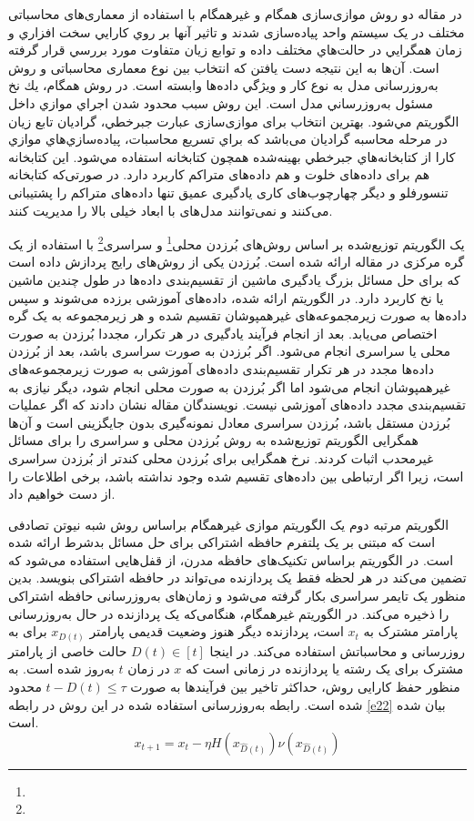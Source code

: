 در مقاله \cite{Ma2019} دو روش موازی‌سازی  همگام و  غیرهمگام با استفاده از معماری‌های‌ محاسباتی مختلف در یک سیستم واحد پیاده‌سازی شدند و تاثير آنها بر روي كارايي سخت افزاري و زمان همگرايي در حالت‌هاي مختلف داده و توابع زیان متفاوت مورد بررسي قرار گرفته است. آن‌ها به این نتیجه دست یافتن که انتخاب بين نوع معماری محاسباتی و روش به‌روزرسانی مدل  به نوع کار و ويژگي داده‌ها وابسته است. در روش  همگام، يك نخ مسئول به‌روزرساني مدل است. اين روش سبب محدود شدن اجراي موازي داخل الگوریتم مي‌شود. بهترین انتخاب برای موازی‌سازی عبارت جبرخطي، گراديان تابع زیان در مرحله محاسبه گراديان می‌باشد که براي تسريع محاسبات، پياده‌سازي‌هاي موازي كارا از كتابخانه‌هاي جبرخطي بهينه‌شده همچون کتابخانه  استفاده مي‌شود. این کتابخانه هم برای داده‌های خلوت و هم داده‌های متراکم کاربرد دارد. در صورتی‌که کتابخانه تنسورفلو و دیگر چهارچوب‌های کاری یادگیری عمیق تنها داده‌های متراکم را پشتیبانی می‌کنند و نمی‌توانند مدل‌های با ابعاد خیلی بالا را مدیریت کنند. 

یک الگوریتم  توزیع‌شده بر اساس روش‌های بُرزدن محلی\footnote{}  و سراسری\footnote{}  با استفاده از یک گره مرکزی در مقاله \cite{MENG201946} ارائه شده است. بُرزدن یکی از روش‌های رایج پردازش داده است که برای حل مسائل بزرگ یادگیری ماشین از تقسیم‌بندی داده‌ها در طول چندین ماشین یا نخ کاربرد دارد. در الگوریتم ارائه شده، داده‌های آموزشی برزده می‌شوند و سپس داده‌ها به صورت زیرمجموعه‌های غیرهمپوشان تقسیم شده و هر زیرمجموعه به یک گره اختصاص می‌یابد. بعد از انجام فرآیند یادگیری در هر تکرار، مجددا بُرزدن به صورت محلی یا سراسری انجام می‌شود. اگر بُرزدن به صورت سراسری باشد، بعد از بُرزدن داده‌ها مجدد در هر تکرار تقسیم‌بندی داده‌های آموزشی به صورت زیرمجموعه‌های غیرهمپوشان انجام می‌شود اما اگر بُرزدن به صورت محلی انجام شود، دیگر نیازی به تقسیم‌بندی مجدد داده‌های آموزشی نیست. نویسندگان مقاله نشان دادند که اگر عملیات بُرزدن مستقل باشد، بُرزدن سراسری معادل نمونه‌گیری بدون جایگزینی است و آن‌ها همگرایی الگوریتم  توزیع‌شده به روش بُرزدن محلی و سراسری را برای مسائل غیرمحدب اثبات کردند. نرخ همگرایی برای بُرزدن محلی کندتر از بُرزدن سراسری است، زیرا اگر ارتباطی بین داده‌های تقسیم شده وجود نداشته باشد، برخی اطلاعات را از دست خواهیم داد.

الگوریتم مرتبه دوم  \cite{tong2020} یک الگوریتم موازی غیرهمگام براساس روش شبه نیوتن تصادفی است که مبتنی بر یک پلتفرم حافظه اشتراکی برای حل مسائل بدشرط ارائه شده است. در الگوریتم  براساس تکنیک‌های حافظه مدرن، از قفل‌هایی استفاده می‌شود که تضمین می‌کند در هر لحظه فقط یک پردازنده می‌تواند در حافظه اشتراکی بنویسد. بدین منظور یک تایمر سراسری  بکار گرفته می‌شود و زمان‌های به‌روزرسانی حافظه اشتراکی را ذخیره می‌کند. در الگوریتم غیرهمگام، هنگامی‌که یک پردازنده در حال به‌روزرسانی پارامتر مشترک  به $x_t$ است، پردازنده دیگر هنوز وضعیت قدیمی پارامتر $x_{D(t)}$ برای به روزرسانی و محاسباتش استفاده می‌کند. در اینجا $D(t)\in [t]$ حالت خاصی از پارامتر مشترک  برای یک رشته یا پردازنده در زمانی است که $x$ در زمان $t$  به‌روز شده است. به منظور حفظ کارایی روش، حداکثر تاخیر بین فرآیندها به صورت $t-D(t)\le \tau$ محدود شده است. رابطه به‌روزرسانی استفاده شده در این روش در رابطه \ref{e22} بیان شده است.
\begin{equation}\label{e22}
	x_{t+1}=x_t-\eta H(x_{\hat{D}(t)})\nu(x_{\hat{D}(t)})
\end{equation}


